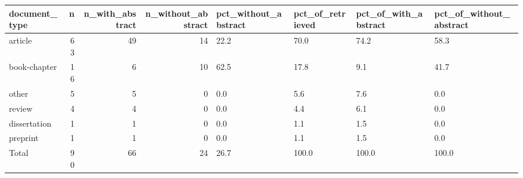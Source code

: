 \begin{tabular}{lrrrllll}
\toprule
document\_type & n & n\_with\_abstract & n\_without\_abstract & pct\_without\_abstract & pct\_of\_retrieved & pct\_of\_with\_abstract & pct\_of\_without\_abstract \\
\midrule
article & 63 & 49 & 14 & 22.2 & 70.0 & 74.2 & 58.3 \\
book-chapter & 16 & 6 & 10 & 62.5 & 17.8 & 9.1 & 41.7 \\
other & 5 & 5 & 0 & 0.0 & 5.6 & 7.6 & 0.0 \\
review & 4 & 4 & 0 & 0.0 & 4.4 & 6.1 & 0.0 \\
dissertation & 1 & 1 & 0 & 0.0 & 1.1 & 1.5 & 0.0 \\
preprint & 1 & 1 & 0 & 0.0 & 1.1 & 1.5 & 0.0 \\
Total & 90 & 66 & 24 & 26.7 & 100.0 & 100.0 & 100.0 \\
\bottomrule
\end{tabular}

